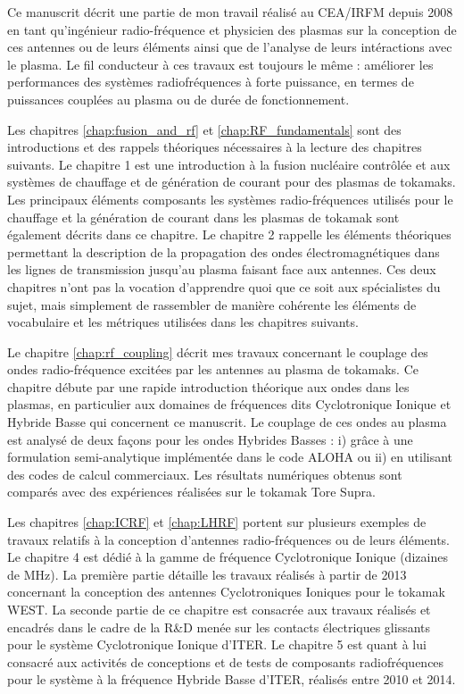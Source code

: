 Ce manuscrit décrit une partie de mon travail réalisé au CEA/IRFM depuis 2008 en tant qu'ingénieur radio-fréquence et physicien des plasmas sur la conception de ces antennes ou de leurs éléments ainsi que de l'analyse de leurs intéractions avec le plasma. Le fil conducteur à ces travaux est toujours le même : améliorer les performances des systèmes radiofréquences à forte puissance, en termes de puissances couplées au plasma ou de durée de fonctionnement.
 

Les chapitres \ref{chap:fusion_and_rf} et \ref{chap:RF_fundamentals} sont des introductions et des rappels théoriques nécessaires à la lecture des chapitres suivants. Le chapitre 1 est une introduction à la fusion nucléaire contrôlée et aux systèmes de chauffage et de génération de courant pour des plasmas de tokamaks. Les principaux éléments composants les systèmes radio-fréquences utilisés pour le chauffage et la génération de courant dans les plasmas de tokamak sont également décrits dans ce chapitre. Le chapitre 2 rappelle les éléments théoriques permettant la description de la propagation des ondes électromagnétiques dans les lignes de transmission jusqu'au plasma faisant face aux antennes. Ces deux chapitres n'ont pas la vocation d'apprendre quoi que ce soit aux spécialistes du sujet, mais simplement de rassembler de manière cohérente les éléments de vocabulaire et les métriques utilisées dans les chapitres suivants.

Le chapitre \ref{chap:rf_coupling} décrit mes travaux concernant le couplage des ondes radio-fréquence excitées par les antennes au plasma de tokamaks. Ce chapitre débute par une rapide introduction théorique aux ondes dans les plasmas, en particulier aux domaines de fréquences dits Cyclotronique Ionique et Hybride Basse qui concernent ce manuscrit. Le couplage de ces ondes au plasma est analysé de deux façons pour les ondes Hybrides Basses : i) grâce à une formulation semi-analytique implémentée dans le code ALOHA ou ii) en utilisant des codes de calcul commerciaux. Les résultats numériques obtenus sont comparés avec  des expériences réalisées sur le tokamak Tore Supra.

Les chapitres \ref{chap:ICRF} et \ref{chap:LHRF} portent sur plusieurs exemples de travaux relatifs à la conception d'antennes radio-fréquences ou de leurs éléments. Le chapitre 4 est dédié à la gamme de fréquence Cyclotronique Ionique (dizaines de MHz). La première partie détaille les travaux réalisés à partir de 2013 concernant la conception des antennes Cyclotroniques Ioniques pour le tokamak WEST. La seconde partie de ce chapitre est consacrée aux travaux réalisés et encadrés dans le cadre de la R\&D menée sur les contacts électriques glissants pour le système Cyclotronique Ionique d'ITER. Le chapitre 5 est quant à lui consacré aux activités de conceptions et de tests de composants radiofréquences pour le système à la fréquence Hybride Basse d'ITER, réalisés entre 2010 et 2014.


